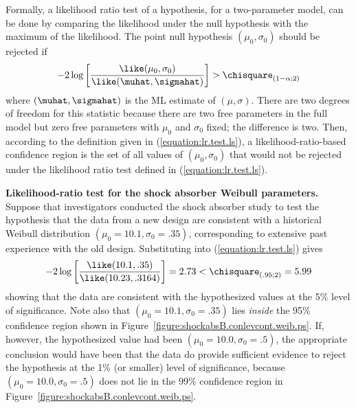 Formally, a likelihood ratio test of a hypothesis, for a
two-parameter model, can be done by comparing the likelihood under
the null hypothesis with the
maximum of the likelihood. The point
null hypothesis $(\mu_{0}, \sigma_{0})$ should be rejected
if
\begin{equation}
\label{equation:lr.test.ls}
-2\log \left[\frac{\like(\mu_{0},\sigma_{0})}{\like(\muhat,\sigmahat) }\right ] > 
	\chisquare_{(1-\alpha;2)}
\end{equation}
where $(\muhat,\sigmahat)$ is the ML estimate of $(\mu,\sigma)$.
There are two degrees of freedom for this statistic because there are
two free parameters in the full model but zero free parameters with
$\mu_{0}$ and $\sigma_{0}$ fixed; the difference is two.  Then,
according to the definition given in (\ref{equation:lr.test.ls}), a
likelihood-ratio-based confidence region is the set of all values of
$(\mu_{0},\sigma_{0})$ that would not be rejected under the likelihood
ratio test defined in (\ref{equation:lr.test.ls}).

\begin{example}
{\bf Likelihood-ratio test for the shock absorber Weibull parameters.}
Suppose that investigators conducted the shock absorber study to test
the hypothesis that the data from a new design are consistent with a
historical Weibull distribution $(\mu_{0}=10.1,\sigma_{0}=.35)$,
corresponding to extensive past experience with the old design.
Substituting into (\ref{equation:lr.test.ls}) gives
\begin{displaymath}
-2\log \left [\frac{\like(10.1,.35)}{\like(10.23,.3164)} \right] = 2.73
	< \chisquare_{(.95;2)} = 5.99
\end{displaymath} 
showing that the data are consistent with the hypothesized values
at the 5\% level of significance. Note also that
$(\mu_{0}=10.1,\sigma_{0}=.35)$ lies {\em inside} the 95\% confidence
region shown in Figure~\ref{figure:shockabsB.conlevcont.weib.ps}. If,
however, the hypothesized value had been
$(\mu_{0}=10.0,\sigma_{0}=.5)$, the appropriate conclusion would have been
that the data do provide sufficient evidence to reject the hypothesis
at the 1\% (or smaller) level of significance, because
$(\mu_{0}=10.0,\sigma_{0}=.5)$ does not lie in the 99\% confidence
region in Figure~\ref{figure:shockabsB.conlevcont.weib.ps}.
\end{example}

